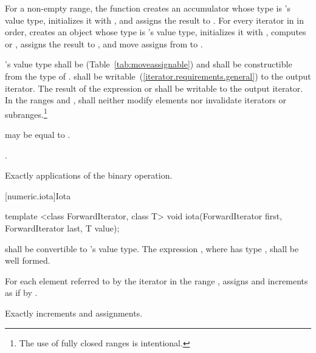 \begin{itemdescr}
\pnum
\effects For a non-empty range,
the function creates an accumulator  whose type is 's
value type, initializes it with ,
and assigns the result to . For every iterator  in 
in order, creates an object  whose type is 's value type, initializes it
with , computes  or , assigns the result
to , and move assigns from  to .

\pnum
\requires
{}'s value type shall be  (Table~\ref{tab:moveassignable})
and shall be constructible from the type of .  shall be
writable~(\ref{iterator.requirements.general}) to the  output iterator. The result of the expression 
or  shall be writable to the  output iterator.
In the ranges
and
,
shall neither modify elements nor invalidate iterators or
subranges.\footnote{The use of fully closed ranges is intentional.}

\pnum
\remarks
{}
may be equal to
.

\pnum
\returns
{}.

\pnum
\complexity
Exactly
applications of
the binary operation.
\end{itemdescr}

[numeric.iota]{Iota}

%
\begin{itemdecl}
template <class ForwardIterator, class T>
  void iota(ForwardIterator first, ForwardIterator last, T value);
\end{itemdecl}

\begin{itemdescr}
\pnum
\requires {} shall be convertible to 's value
type. The expression , where  has type , shall
be well formed.

\pnum
\effects For each element referred to by the iterator  in the range
, assigns  and increments  as
if by .

\pnum
\complexity Exactly  increments and assignments.
\end{itemdescr}

